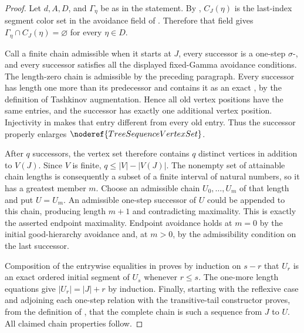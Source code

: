 \begin{proof}
Let $d,A,D$, and $\Gamma_\eta$ be as in the statement.  By
, $C_J(\eta)$ is the last-index segment
color set in the avoidance field of .  Therefore
that field gives
$\Gamma_\eta\cap C_J(\eta)=\varnothing$ for every $\eta\in D$.

Call a finite chain admissible when it starts at $J$, every successor is a
one-step $\sigma$-, and every successor
satisfies all the displayed fixed-Gamma avoidance conditions.  The
length-zero chain is admissible by the preceding paragraph.  Every
successor has length one more than its predecessor and contains it as an
exact , by the definition of
Tashkinov augmentation.  Hence all old vertex positions have the same
entries, and the successor has exactly one additional vertex position.
Injectivity in  makes that entry different from
every old entry.  Thus the successor properly enlarges
$\noderef{TreeSequenceVertexSet}$.

After $q$ successors, the vertex set therefore contains $q$ distinct
vertices in addition to $V(J)$.  Since $V$ is finite, $q\leq
|V|-|V(J)|$.  The nonempty set of attainable chain lengths is consequently
a subset of a finite interval of natural numbers, so it has a greatest
member $m$.  Choose an admissible chain $U_0,\ldots,U_m$ of that length and
put $U=U_m$.  An admissible one-step successor of $U$ could be appended to
this chain, producing length $m+1$ and contradicting maximality.  This is
exactly the asserted endpoint maximality.  Endpoint avoidance holds at
$m=0$ by the initial good-hierarchy avoidance and, at $m>0$, by the
admissibility condition on the last successor.

Composition of the entrywise equalities in
 proves by induction on $s-r$ that
$U_r$ is an exact ordered initial segment of $U_s$ whenever $r\leq s$.
The one-more length equations give $|U_r|=|J|+r$ by induction.  Finally,
starting with the reflexive case and adjoining each one-step relation with
the transitive-tail constructor proves, from the definition of
, that the complete chain is such a
sequence from $J$ to $U$.  All claimed chain properties follow.
\end{proof}

